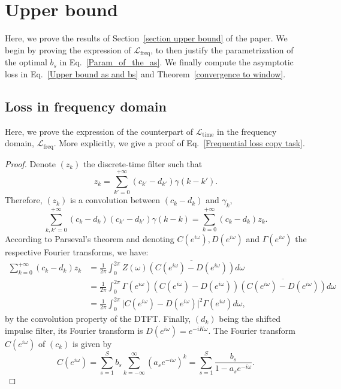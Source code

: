 \section{Upper bound}

Here, we prove the results of Section~\ref{section upper bound} of the paper. We begin by proving the expression of $\mathcal{L}_\text{freq}$, to then justify the parametrization of the optimal $b_s$ in Eq.~\eqref{Param_of_the_as}. We finally compute the asymptotic loss in  Eq.~\eqref{Upper bound as and bs} and Theorem~\ref{convergence to window}.

\subsection{Loss in frequency domain}\label{appendix subsection frequency loss}

Here, we prove the expression of the counterpart of $\mathcal{L}_\text{time}$ in the frequency domain, $\mathcal{L}_\text{freq}$. More explicitly, we give a proof of Eq.~\eqref{Frequential loss copy task}.


\begin{proof}
    Denote $(z_k)$ the discrete-time filter such that 
    \[
    z_k = \sum_{k'=0}^{+\infty}(c_{k'} - d_{k'})\gamma(k-k').
    \]
    Therefore, $(z_k)$ is a convolution between $(c_k-d_k)$ and $\gamma_k$, 
    \[
    \sum_{k, k'=0}^{+\infty}(c_k - d_k)(c_{k'} - d_{k'})\gamma(k-k) = \sum_{k=0}^{+\infty}(c_k - d_k)z_k.
    \]
    According to Parseval's theorem and denoting $C(e^{i\omega}), D(e^{i\omega})$ and $\Gamma(e^{i\omega})$ the respective Fourier transforms, we have: 
    \begin{align*}
        \sum_{k=0}^{+\infty}(c_k - d_k)z_k &= \frac{1}{2\pi}\int_0^{2\pi}Z(\omega)\overline{(C(e^{i\omega}) - D(e^{i\omega}))}d\omega\\
        &= \frac{1}{2\pi}\int_0^{2\pi}\Gamma(e^{i\omega})(C(e^{i\omega}) - D(e^{i\omega}))\overline{(C(e^{i\omega}) - D(e^{i\omega}))}d\omega\\
        &= \frac{1}{2\pi}\int_0^{2\pi}\big\vert C(e^{i\omega}) - D(e^{i\omega})\big\vert^2\Gamma(e^{i\omega})d\omega,
    \end{align*}
    by the convolution property of the DTFT. Finally, $(d_k)$ being the shifted impulse filter, its Fourier transform is $D(e^{i\omega})=e^{-iK\omega}$. The Fourier transform $C(e^{i\omega})$ of $(c_k)$ is given by 
        \[
    C(e^{i\omega}) = \sum_{s=1}^S b_s \sum_{k=-\infty}^\infty \left(a_s e^{-i\omega}\right)^k = \sum_{s=1}^S \frac{b_s}{1 - a_s e^{-i\omega}}.
    \]
\end{proof}

